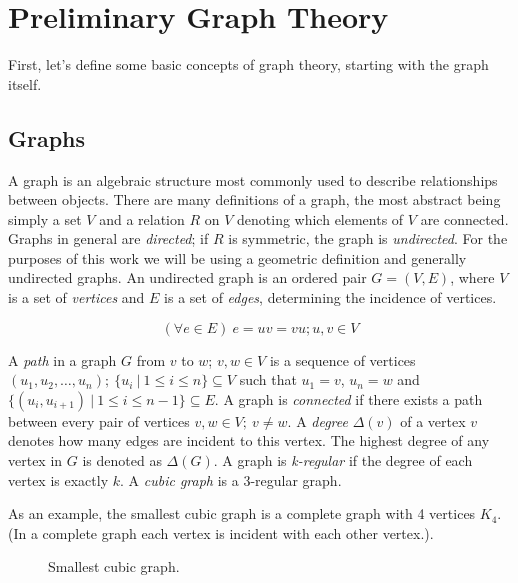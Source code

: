\chapter{Preliminary Graph Theory}\label{ch:prelim}

First, let's define some basic concepts of graph theory, starting with the graph itself.

\section{Graphs}

A graph is an algebraic structure most commonly used to describe relationships between objects. There are many definitions of a graph, the most abstract being simply a set $V$ and a relation $R$ on $V$ denoting which elements of $V$ are connected. Graphs in general are \textit{directed}; if $R$ is symmetric, the graph is \textit{undirected}. For the purposes of this work we will be using a geometric definition and generally undirected graphs.
An undirected graph is an ordered pair $G = (V, E)$, where $V$ is a set of \textit{vertices} and $E$ is a set of \textit{edges}, determining the incidence of vertices.

$$(\forall e \in E) ~ e = uv = vu; u,v \in V$$

A \textit{path} in a graph $G$ from $v$ to $w$; $v,w \in V$ is a sequence of vertices $(u_1, u_2, \dots, u_n); ~ \{u_i ~|~ 1 \leq i \leq n\} \subseteq V$ such that $u_1 = v$, $u_n = w$ and $\{(u_i, u_{i+1}) ~|~ 1 \leq i \leq n-1\} \subseteq E$. A graph is \textit{connected} if there exists a path between every pair of vertices $v,w \in V; ~ v \neq w$.
A \textit{degree} $\Delta (v)$ of a vertex $v$ denotes how many edges are incident to this vertex. The highest degree of any vertex in $G$ is denoted as $\Delta(G)$.
A graph is \textit{k-regular} if the degree of each vertex is exactly $k$. A \textit{cubic graph} is a 3-regular graph.

As an example, the smallest cubic graph is a complete graph with 4 vertices $K_4$. (In a complete graph each vertex is incident with each other vertex.).

\begin{figure}[h]
    \centering
        \caption[Smallest cubic graph]{Smallest cubic graph.}
\end{figure}


